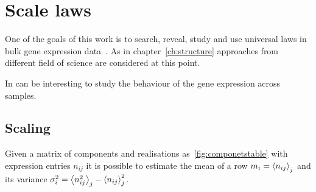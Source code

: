 \chapter{Scale laws}\label{ch:scalelaws}
One of the goals of this work is to search, reveal, study and use universal laws in bulk gene expression data~\nocite{altmann2016statistical}.
As in chapter~\ref{ch:structure} approaches from different field of science are considered at this point.

In can be interesting to study the behaviour of the gene expression across samples.

\section{Scaling}

Given a matrix of components and realisations as~\ref{fig:componetstable} with expression entries $n_{i j}$ it is possible to estimate the mean of a row $m_i=\left\langle n_{i j}\right\rangle_j$ and its variance $\sigma^2_{i}=\left\langle n_{i j}^2\right\rangle_j - \left\langle n_{i j}\right\rangle^2_j$.

